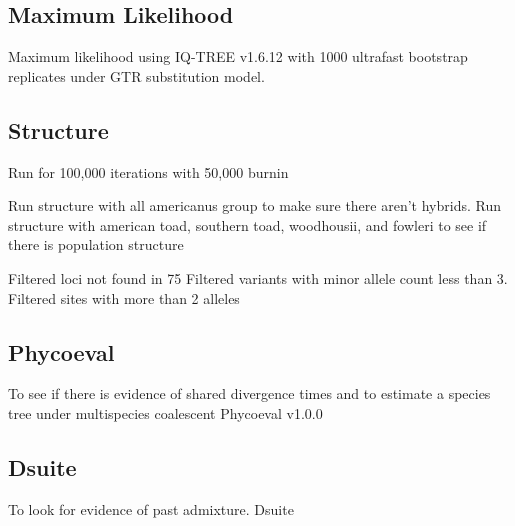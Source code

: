 



\subsection{Maximum Likelihood}

Maximum likelihood using IQ-TREE v1.6.12 \parencite{nguyen2015} 
with 1000 ultrafast bootstrap replicates \parencite{hoang2018}
under GTR substitution model.

\subsection{Structure}

Run for 100,000 iterations with 50,000 burnin


Run structure with all americanus group to make sure there aren't hybrids.
Run structure with american toad, southern toad, woodhousii, and fowleri to see if there is population structure 

Filtered loci not found in 75%
Filtered variants with minor allele count less than 3.
Filtered sites with more than 2 alleles














\subsection{Phycoeval}
To see if there is evidence of shared divergence times and to estimate a species tree under multispecies coalescent
Phycoeval v1.0.0 \parencite{oaks2022} 

\subsection{Dsuite}
To look for evidence of past admixture.
Dsuite \parencite{malinsky2021}


